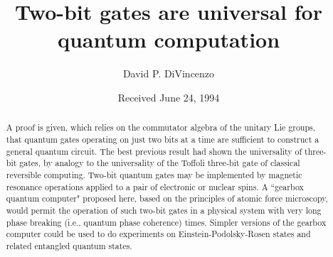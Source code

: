 
%
%
%
%
%
%

\title{Two-bit gates are universal for quantum computation\\
}
\author{David P. DiVincenzo
}
\medskip

\date{Received June 24, 1994}
\maketitle
\begin{abstract}
A proof is given,
which relies on the commutator algebra of the unitary Lie groups,
that quantum gates operating on just two bits at a time are
sufficient to construct a general quantum circuit.  The best previous
result had shown
the universality of three-bit gates, by analogy to the universality
of the Toffoli three-bit gate of classical reversible computing.
Two-bit quantum gates may be implemented by magnetic resonance operations
applied to a pair of electronic or nuclear spins.  A ``gearbox quantum
computer" proposed here, based on the principles of atomic force microscopy,
would permit the operation of such two-bit
gates in a physical system with very long phase breaking (i.e., quantum
phase coherence) times.  Simpler versions of the gearbox computer
could be used to do experiments on Einstein-Podolsky-Rosen states
and related entangled quantum states.
\end{abstract}















